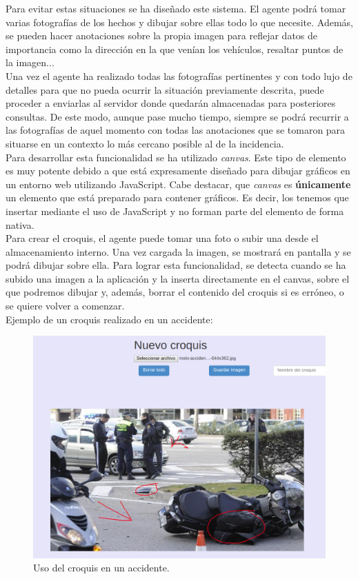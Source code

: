 Para evitar estas situaciones se ha diseñado este sistema. El agente podrá tomar varias fotografías de los hechos y dibujar sobre ellas todo lo que necesite. Además, se 
pueden hacer anotaciones sobre la propia imagen para reflejar datos de importancia como la dirección en la que venían los vehículos, resaltar puntos de la imagen...\\

Una vez el agente ha realizado todas las fotografías pertinentes y con todo lujo de detalles para que no pueda ocurrir la situación previamente descrita,
puede proceder a enviarlas al servidor donde quedarán almacenadas para posteriores consultas. De este modo, aunque pase mucho tiempo, siempre se podrá recurrir a 
las fotografías de aquel momento con todas las anotaciones que se tomaron para situarse en un contexto lo más cercano posible al de la incidencia. \\

Para desarrollar esta funcionalidad se ha utilizado \textit{canvas}\cite{canvas}. Este tipo de elemento es muy potente debido a que está expresamente diseñado para 
dibujar gráficos en un entorno web utilizando JavaScript. Cabe destacar, que \textit{canvas} es \textbf{únicamente} un elemento que está preparado para contener gráficos.
Es decir, los tenemos que insertar mediante el uso de JavaScript y no forman parte del elemento de forma nativa.\\

Para crear el croquis, el agente puede tomar una foto o subir una desde el almacenamiento interno. Una vez cargada la imagen, se mostrará en pantalla y se podrá 
dibujar sobre ella. Para lograr esta funcionalidad, se detecta cuando se ha subido una imagen a la aplicación y la inserta directamente en el canvas, sobre el que 
podremos dibujar y, además, borrar el contenido del croquis si es erróneo, o se quiere volver a comenzar.\\

Ejemplo de un croquis realizado en un accidente:

\begin{figure}[H]
	\centering
	\includegraphics[scale=0.45]{imagenes/sketch.png}
	\caption{Uso del croquis en un accidente.}
\end{figure}


